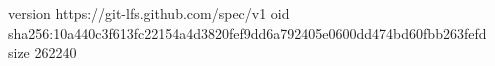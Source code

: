 version https://git-lfs.github.com/spec/v1
oid sha256:10a440c3f613fc22154a4d3820fef9dd6a792405e0600dd474bd60fbb263fefd
size 262240

